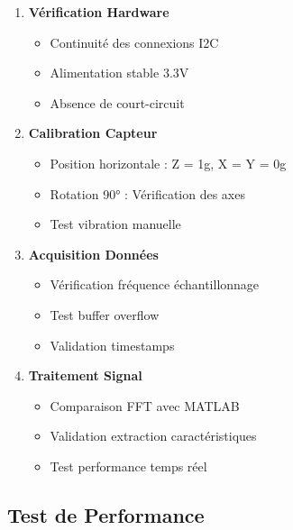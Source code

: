 \begin{enumerate}
    \item \textbf{Vérification Hardware}
    \begin{itemize}
        \item Continuité des connexions I2C
        \item Alimentation stable 3.3V
        \item Absence de court-circuit
    \end{itemize}
    
    \item \textbf{Calibration Capteur}
    \begin{itemize}
        \item Position horizontale : Z = 1g, X = Y = 0g
        \item Rotation 90° : Vérification des axes
        \item Test vibration manuelle
    \end{itemize}
    
    \item \textbf{Acquisition Données}
    \begin{itemize}
        \item Vérification fréquence échantillonnage
        \item Test buffer overflow
        \item Validation timestamps
    \end{itemize}
    
    \item \textbf{Traitement Signal}
    \begin{itemize}
        \item Comparaison FFT avec MATLAB
        \item Validation extraction caractéristiques
        \item Test performance temps réel
    \end{itemize}
\end{enumerate}

\subsection{Test de Performance}

